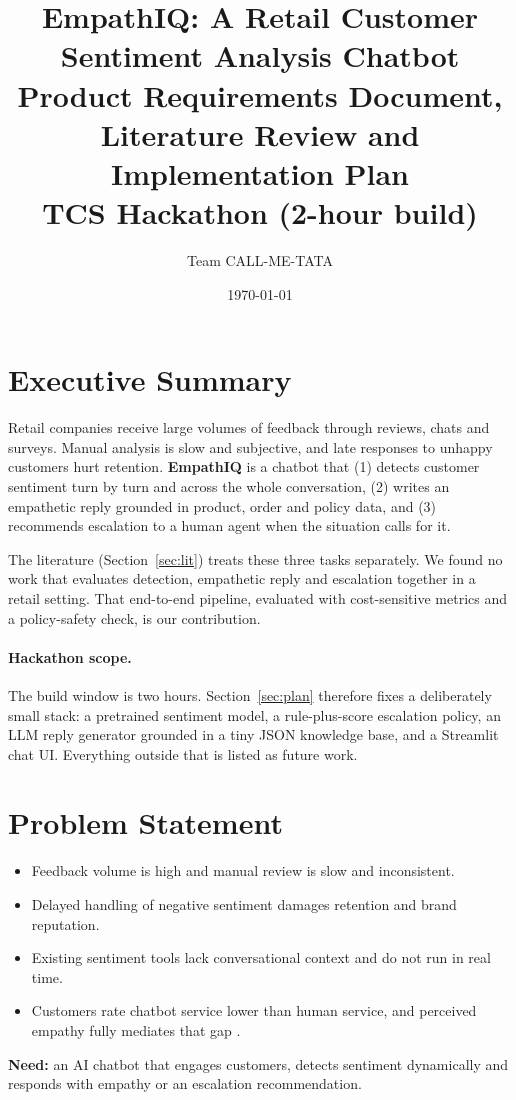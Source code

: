\documentclass[11pt,a4paper]{article}
\title{\textbf{EmpathIQ: A Retail Customer Sentiment Analysis Chatbot}\\[2pt]
\large Product Requirements Document, Literature Review and Implementation Plan\\
\normalsize TCS Hackathon (2-hour build)}
\author{Team CALL-ME-TATA}
\date{\today}
\begin{document}
\maketitle
\tableofcontents
\newpage

\section{Executive Summary}
Retail companies receive large volumes of feedback through reviews, chats and surveys. Manual analysis is slow and subjective, and late responses to unhappy customers hurt retention. \textbf{EmpathIQ} is a chatbot that (1) detects customer sentiment turn by turn and across the whole conversation, (2) writes an empathetic reply grounded in product, order and policy data, and (3) recommends escalation to a human agent when the situation calls for it.

The literature (Section~\ref{sec:lit}) treats these three tasks separately. We found no work that evaluates detection, empathetic reply and escalation together in a retail setting. That end-to-end pipeline, evaluated with cost-sensitive metrics and a policy-safety check, is our contribution.

\paragraph{Hackathon scope.} The build window is two hours. Section~\ref{sec:plan} therefore fixes a deliberately small stack: a pretrained sentiment model, a rule-plus-score escalation policy, an LLM reply generator grounded in a tiny JSON knowledge base, and a Streamlit chat UI. Everything outside that is listed as future work.

\section{Problem Statement}
\begin{itemize}
\item Feedback volume is high and manual review is slow and inconsistent.
\item Delayed handling of negative sentiment damages retention and brand reputation.
\item Existing sentiment tools lack conversational context and do not run in real time.
\item Customers rate chatbot service lower than human service, and perceived empathy fully mediates that gap \cite{markovitch2024}.
\end{itemize}
\textbf{Need:} an AI chatbot that engages customers, detects sentiment dynamically and responds with empathy or an escalation recommendation.
\end{document}
